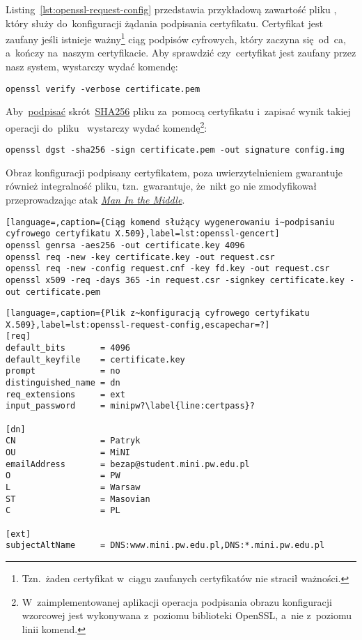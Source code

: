 \documentclass[thesis]{subfiles}
\begin{document}
Listing~\ref{lst:openssl-request-config} przedstawia przykładową zawartość pliku , który służy do~konfiguracji żądania podpisania certyfikatu. Certyfikat jest zaufany jeśli istnieje ważny\footnote{Tzn.~żaden certyfikat w~ciągu zaufanych certyfikatów nie stracił ważności.} ciąg podpisów cyfrowych, który zaczyna się~od~\gls{ca}, a~kończy na~naszym certyfikacie. Aby sprawdzić czy~certyfikat jest zaufany przez nasz system, wystarczy wydać komendę:\mynobreakpar

\begin{center}
	\texttt{openssl verify -verbose certificate.pem}
\end{center}

Aby~\href{http://stackoverflow.com/questions/10782826/digital-signature-for-a-file-using-openssl}{podpisać} skrót~\href{https://en.wikipedia.org/wiki/SHA-2}{SHA256} pliku  za~pomocą certyfikatu  i~zapisać wynik takiej operacji do~pliku~ wystarczy wydać komendę\footnote{W~zaimplementowanej aplikacji operacja podpisania obrazu konfiguracji wzorcowej jest wykonywana z~poziomu biblioteki OpenSSL, a~nie z~poziomu linii komend.}:\mynobreakpar

\begin{center}
	\texttt{openssl dgst -sha256 -sign certificate.pem -out signature config.img}
\end{center}

Obraz konfiguracji podpisany certyfikatem, poza uwierzytelnieniem gwarantuje również integralność pliku, tzn.~gwarantuje, że~nikt go nie zmodyfikował przeprowadzając atak \emph{\hyperlink{itm:mitm}{Man In the Middle}}.

\begin{minipage}{\linewidth} %
\begin{lstlisting}[language=,caption={Ciąg komend służący wygenerowaniu i~podpisaniu cyfrowego certyfikatu X.509},label=lst:openssl-gencert]
openssl genrsa -aes256 -out certificate.key 4096
openssl req -new -key certificate.key -out request.csr
openssl req -new -config request.cnf -key fd.key -out request.csr
openssl x509 -req -days 365 -in request.csr -signkey certificate.key -out certificate.pem
\end{lstlisting}
\end{minipage}

\begin{lstlisting}[language=,caption={Plik z~konfiguracją cyfrowego certyfikatu X.509},label=lst:openssl-request-config,escapechar=?]
[req]
default_bits       = 4096
default_keyfile    = certificate.key
prompt             = no
distinguished_name = dn
req_extensions     = ext
input_password     = minipw?\label{line:certpass}?

[dn]
CN                 = Patryk
OU                 = MiNI
emailAddress       = bezap@student.mini.pw.edu.pl
O                  = PW
L                  = Warsaw
ST                 = Masovian
C                  = PL

[ext]
subjectAltName     = DNS:www.mini.pw.edu.pl,DNS:*.mini.pw.edu.pl
\end{lstlisting}
\end{document}
